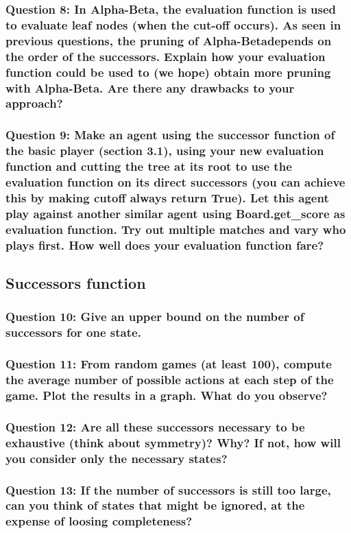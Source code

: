 \documentclass[a4paper,10pt]{article}
\begin{document}
				\subsubsection{Question 8: In Alpha-Beta, the evaluation function is used to evaluate leaf nodes (when the cut-off occurs). As seen in previous questions, the pruning of Alpha-Betadepends on the order of the successors. Explain how your evaluation function could be used to (we hope) obtain more pruning with Alpha-Beta. Are there any drawbacks to your approach?}
				\subsubsection{Question 9: Make an agent using the successor function of the basic player (section 3.1), using your new evaluation function and cutting the tree at its root to use the evaluation function on its direct successors (you can achieve this by making cutoff always return True). Let this agent play against another similar agent using Board.get_score as evaluation function. Try out multiple matches and vary who plays first. How well does your evaluation function fare?}
			
			\subsection{Successors function}
				\subsubsection{Question 10: Give an upper bound on the number of successors for one state.}
				\subsubsection{Question 11: From random games (at least 100), compute the average number of possible
actions at each step of the game. Plot the results in a graph. What do you observe?}
				\subsubsection{Question 12: Are all these successors necessary to be exhaustive (think about symmetry)? Why? If not, how will you consider only the necessary states?}
				\subsubsection{Question 13: If the number of successors is still too large, can you think of states that might be ignored, at the expense of loosing completeness?}
\end{document}
